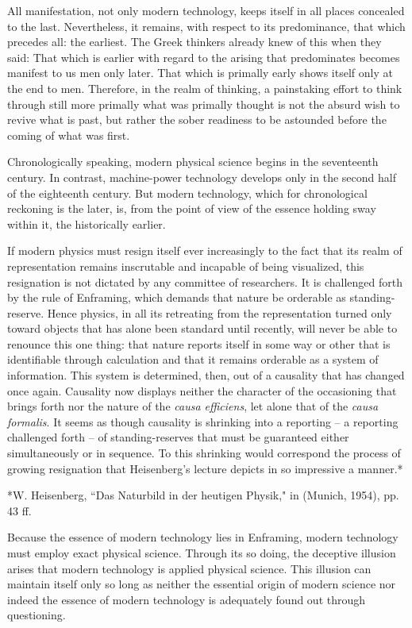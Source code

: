 All manifestation, not only modern technology, keeps itself in all places concealed to the last. Nevertheless, it remains, with respect to its predominance, that which precedes all: the earliest. The Greek thinkers already knew of this when they said: That which is earlier with regard to the arising that predominates becomes manifest to us men only later. That which is primally early shows itself only at the end to men. Therefore, in the realm of thinking, a painstaking effort to think through still more primally what was primally thought is not the absurd wish to revive what is past, but rather the sober readiness to be astounded before the coming of what was first.

Chronologically speaking, modern physical science begins in the seventeenth century. In contrast, machine-power technology develops only in the second half of the eighteenth century. But modern technology, which for chronological reckoning is the later, is, from the point of view of the essence holding sway within it, the historically earlier.

If modern physics must resign itself ever increasingly to the fact that its realm of representation remains inscrutable and incapable of being visualized, this resignation is not dictated by any committee of researchers. It is challenged forth by the rule of Enframing, which demands that nature be orderable as standing-reserve. Hence physics, in all its retreating from the representation turned only toward objects that has alone been standard until recently, will never be able to renounce this one thing: that nature reports itself in some way or other that is identifiable through calculation and that it remains orderable as a system of information. This system is determined, then, out of a causality that has changed once again. Causality now displays neither the character of the occasioning that brings forth nor the nature of the \textit{causa efficiens}, let alone that of the \textit{causa formalis}. It seems as though causality is shrinking into a reporting -- a reporting challenged forth -- of standing-reserves that must be guaranteed either simultaneously or in sequence. To this shrinking would correspond the process of growing resignation that Heisenberg's lecture depicts in so impressive a manner.*

*W. Heisenberg, ``Das Naturbild in der heutigen Physik," in  (Munich, 1954), pp. 43 ff.

Because the essence of modern technology lies in Enframing, modern technology must employ exact physical science. Through its so doing, the deceptive illusion arises that modern technology is applied physical science. This illusion can maintain itself only so long as neither the essential origin of modern science nor indeed the essence of modern technology is adequately found out through questioning.

